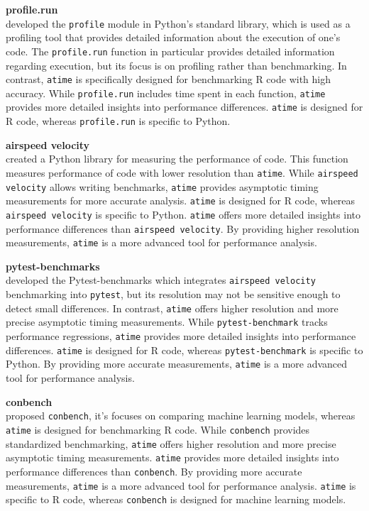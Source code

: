 \textbf{profile.run} \\
\citet{profile} developed the \texttt{profile} module in Python's standard library, which is used as a profiling tool that provides detailed information about the execution of one's code. The \texttt{profile.run} function in particular provides detailed information regarding execution, but its focus is on profiling rather than benchmarking. In contrast, \texttt{atime} is specifically designed for benchmarking R code with high accuracy. While \texttt{profile.run} includes time spent in each function, \texttt{atime} provides more detailed insights into performance differences. \texttt{atime} is designed for R code, whereas \texttt{profile.run} is specific to Python.
\vspace{0.1in}

\textbf{airspeed velocity} \\
\citet{airspeed_velocity} created a Python library for measuring the performance of code. This function measures performance of code with lower resolution than \texttt{atime}. While \texttt{airspeed velocity} allows writing benchmarks, \texttt{atime} provides asymptotic timing measurements for more accurate analysis. \texttt{atime} is designed for R code, whereas \texttt{airspeed velocity} is specific to Python. \texttt{atime} offers more detailed insights into performance differences than \texttt{airspeed velocity}. By providing higher resolution measurements, \texttt{atime} is a more advanced tool for performance analysis.
\vspace{0.1in}

\textbf{pytest-benchmarks} \\
\citet{pytest_benchmark} developed the Pytest-benchmarks which integrates \texttt{airspeed velocity} benchmarking into \texttt{pytest}, but its resolution may not be sensitive enough to detect small differences. In contrast, \texttt{atime} offers higher resolution and more precise asymptotic timing measurements. While \texttt{pytest-benchmark} tracks performance regressions, \texttt{atime} provides more detailed insights into performance differences. \texttt{atime} is designed for R code, whereas \texttt{pytest-benchmark} is specific to Python. By providing more accurate measurements, \texttt{atime} is a more advanced tool for performance analysis.
\vspace{0.1in}

\textbf{conbench} \\
\citet{conbench} proposed \texttt{conbench}, it's focuses on comparing machine learning models, whereas \texttt{atime} is designed for benchmarking R code. While \texttt{conbench} provides standardized benchmarking, \texttt{atime} offers higher resolution and more precise asymptotic timing measurements. \texttt{atime} provides more detailed insights into performance differences than \texttt{conbench}. By providing more accurate measurements, \texttt{atime} is a more advanced tool for performance analysis. \texttt{atime} is specific to R code, whereas \texttt{conbench} is designed for machine learning models.
\vspace{0.1in}

